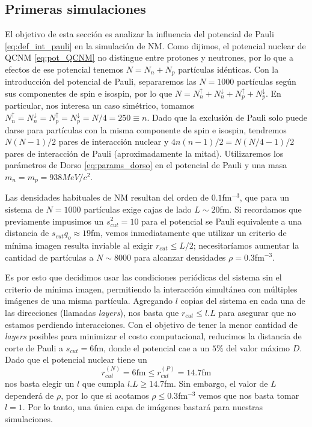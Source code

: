 \subsection{Primeras simulaciones}

El objetivo de esta sección es analizar la influencia del potencial de Pauli \eqref{eq:def_int_pauli} en la simulación de NM. 
Como dijimos, el potencial nuclear de QCNM \eqref{eq:pot_QCNM} no distingue entre protones y neutrones, por lo que a efectos de ese potencial tenemos $N=N_n+N_p$ partículas idénticas.
Con la introducción del potencial de Pauli, separaremos las $N=1000$ partículas según sus componentes de spin e isospin, por lo que $N = N_n^\uparrow+N_n^\downarrow+N_p^\uparrow+N_p^\downarrow$.
En particular, nos interesa un caso simétrico, tomamos $N_n^\uparrow=N_n^\downarrow=N_p^\uparrow=N_p^\downarrow = N/4 = 250\equiv n$.
Dado que la exclusión de Pauli solo puede darse para partículas con la misma componente de spin e isospin, tendremos $N(N-1)/2$ pares de interacción nuclear y $4n(n-1)/2 = N(N/4-1)/2$ 
pares de interacción de Pauli (aproximadamente la mitad). 
Utilizaremos los parámetros de Dorso \eqref{eq:params_dorso} en el potencial de Pauli y una masa $m_n=m_p=938MeV/c^2$.

Las densidades habituales de NM resultan del orden de $0.1$fm$^{-3}$, que para un sistema de $N=1000$ partículas exige cajas de lado $L\sim 20$fm.
Si recordamos que previamente impusimos un $s_{cut}^2=10$ para el potencial se Pauli equivalente a una distancia de $s_{cut}q_o \approx 19$fm, vemos inmediatamente que utilizar un criterio de
mínima imagen resulta inviable al exigir $r_{cut}\leq L/2$; necesitaríamos aumentar la cantidad de partículas a $N\sim8000$ para alcanzar densidades $\rho=0.3$fm$^{-3}$.

Es por esto que decidimos usar las condiciones periódicas del sistema sin el criterio de mínima imagen, permitiendo la interacción simultánea con múltiples imágenes de una misma partícula.
Agregando $l$ copias del sistema en cada una de las direcciones (llamadas \textit{layers}), nos basta que $r_{cut}\leq l.L$ para asegurar que no estamos perdiendo interacciones.
Con el objetivo de tener la menor cantidad de \textit{layers} posibles para minimizar el costo computacional, reducimos la distancia de corte de Pauli a $s_{cut}=6$fm, donde el potencial cae a un $5\%$
del valor máximo $D$.
Dado que el potencial nuclear tiene un 
\[r_{cut}^{(N)} = 6\text{fm}\leq r_{cut}^{(P)} = 14.7\text{fm} \]
 nos basta elegir un $l$ que cumpla $l.L \geq 14.7$fm.
Sin embargo, el valor de $L$ dependerá de $\rho$, por lo que si acotamos $\rho\leq 0.3$fm$^{-3}$ vemos que nos basta tomar $l=1$.
Por lo tanto, una única capa de imágenes bastará para nuestras simulaciones.


